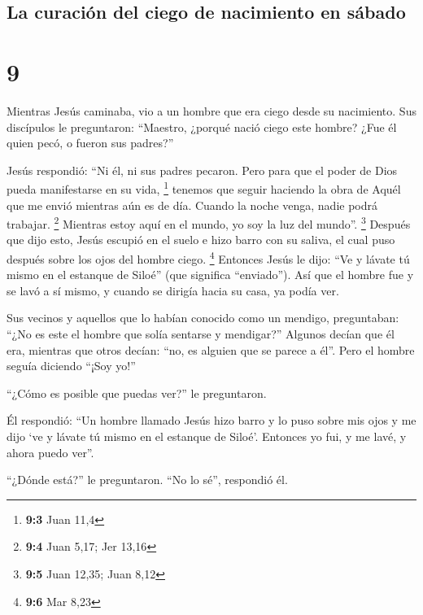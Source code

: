 \hypertarget{la-curaciuxf3n-del-ciego-de-nacimiento-en-suxe1bado}{%
\subsection{La curación del ciego de nacimiento en
sábado}\label{la-curaciuxf3n-del-ciego-de-nacimiento-en-suxe1bado}}

\hypertarget{section-8}{%
\section{9}\label{section-8}}

 Mientras Jesús caminaba, vio a un hombre que era ciego
desde su nacimiento.  Sus discípulos le preguntaron:
``Maestro, ¿porqué nació ciego este hombre? ¿Fue él quien pecó, o fueron
sus padres?''

 Jesús respondió: ``Ni él, ni sus padres pecaron. Pero
para que el poder de Dios pueda manifestarse en su vida, \footnote{\textbf{9:3}
  Juan 11,4}  tenemos que seguir haciendo la obra de Aquél
que me envió mientras aún es de día. Cuando la noche venga, nadie podrá
trabajar. \footnote{\textbf{9:4} Juan 5,17; Jer 13,16} 
Mientras estoy aquí en el mundo, yo soy la luz del mundo''. \footnote{\textbf{9:5}
  Juan 12,35; Juan 8,12}  Después que dijo esto, Jesús
escupió en el suelo e hizo barro con su saliva, el cual puso después
sobre los ojos del hombre ciego. \footnote{\textbf{9:6} Mar 8,23}
 Entonces Jesús le dijo: ``Ve y lávate tú mismo en el
estanque de Siloé'' (que significa ``enviado''). Así que el hombre fue y
se lavó a sí mismo, y cuando se dirigía hacia su casa, ya podía ver.

 Sus vecinos y aquellos que lo habían conocido como un
mendigo, preguntaban: ``¿No es este el hombre que solía sentarse y
mendigar?''  Algunos decían que él era, mientras que otros
decían: ``no, es alguien que se parece a él''. Pero el hombre seguía
diciendo ``¡Soy yo!''

 ``¿Cómo es posible que puedas ver?'' le preguntaron.

 Él respondió: ``Un hombre llamado Jesús hizo barro y lo
puso sobre mis ojos y me dijo `ve y lávate tú mismo en el estanque de
Siloé'. Entonces yo fui, y me lavé, y ahora puedo ver''.

 ``¿Dónde está?'' le preguntaron. ``No lo sé'', respondió
él.

